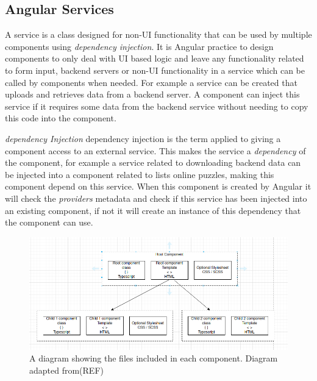 \documentclass{l4proj}
\begin{document}
\subsection{Angular Services}
A service is a class designed for non-UI functionality that can be used by multiple components using \emph{dependency injection}. It is Angular practice to design components to only deal with UI based logic and leave any functionality related to form input, backend servers or non-UI functionality in a service which can be called by components when needed. For example a service can be created that uploads and retrieves data from a backend server. A component can inject this service if it requires some data from the backend service without needing to copy this code into the component. 

\emph{dependency Injection}
dependency injection is the term applied to giving a component access to an external service. This makes the service a \emph{dependency} of the component, for example a service related to downloading backend data can be injected into a component related to lists online puzzles, making this component depend on this service. When this component is created by Angular it will check the \emph{providers} metadata and check if this service has been injected into an existing component, if not it will create an instance of this dependency that the component can use. 

\begin{figure}
    \centering
    \includegraphics[width=1\linewidth]{images/componentDesign.png}
    \caption{A diagram showing the files included in each component. Diagram adapted from(REF)}
    \label{fig:angularComp}
\end{figure}

\end{document}
